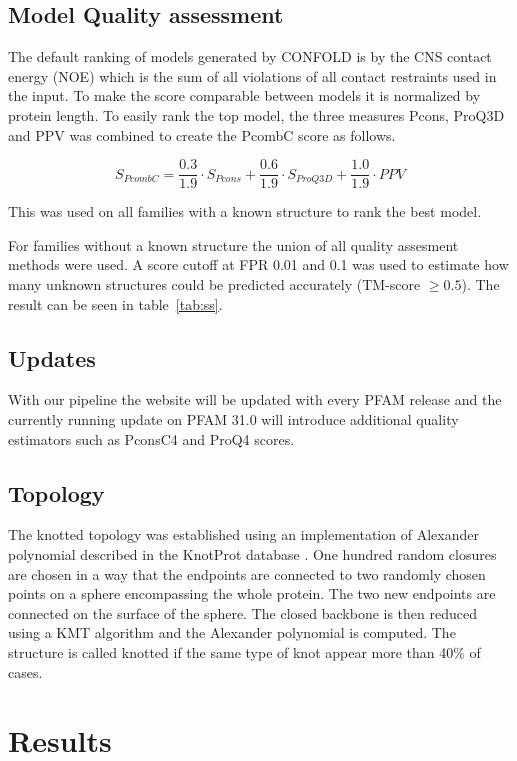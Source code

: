 \documentclass[a4,center,fleqn]{NAR}
\begin{document}
\subsection{Model Quality assessment}
The default ranking of models generated by CONFOLD is by the CNS contact energy (NOE) 
which is the sum of all violations of all contact restraints used in the input.
To make the score comparable between models it is normalized by protein length.
To easily rank the top model, the three measures Pcons, ProQ3D and PPV was 
combined to create the PcombC score as follows.

$$
S_{PcombC} = \frac{0.3}{1.9} \cdot S_{Pcons} + \frac{0.6}{1.9} \cdot S_{ProQ3D} + \frac{1.0}{1.9} \cdot PPV
$$

This was used on all families with a known structure to rank the best model.

For families without a known structure the union of all quality assesment methods were used.
A score cutoff at FPR 0.01 and 0.1 was used to estimate how many unknown structures
could be predicted accurately (TM-score $\ge 0.5$). The result can be seen in table~\ref{tab:ss}.
\subsection{Updates}

With our pipeline the website will be updated with every PFAM release
and the currently running update on PFAM 31.0 will introduce
additional quality estimators such as PconsC4 and ProQ4
scores. 

\subsection{Topology}
The knotted topology was established using an implementation of Alexander polynomial described in the KnotProt database \cite{jamroz2014knotprot}. One hundred random closures are chosen in a way that the endpoints are connected to two randomly 
chosen points on a sphere encompassing the whole protein. The two new endpoints are 
connected on the surface of the sphere. The closed backbone is then reduced using a
KMT algorithm and the Alexander polynomial is computed. The structure is called knotted if the same type of knot
appear more than 40\% of cases. 

\section{Results}
\end{document}
